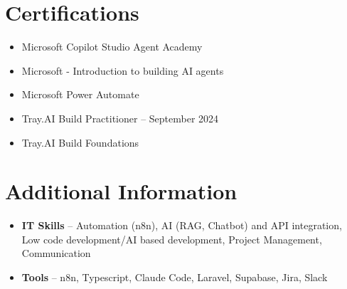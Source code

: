 \documentclass[a4paper,10pt]{article}
\begin{document}
\section{Certifications}
\begin{itemize}
\item Microsoft Copilot Studio Agent Academy
\item Microsoft - Introduction to building AI agents
\item Microsoft Power Automate
\item Tray.AI Build Practitioner -- September 2024
\item Tray.AI Build Foundations
\end{itemize}

\section{Additional Information}
\begin{itemize}
\item \textbf{IT Skills} -- Automation (n8n), AI (RAG, Chatbot) and API integration, Low code development/AI based development, Project Management, Communication
\item \textbf{Tools} -- n8n, Typescript, Claude Code, Laravel, Supabase, Jira, Slack
\end{itemize}
\end{document}
